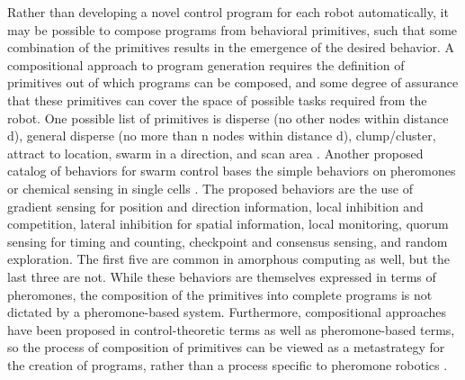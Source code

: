 Rather than developing a novel control program for each robot automatically, it may be possible to compose programs from behavioral primitives, such that some combination of the primitives results in the emergence of the desired behavior. 
A compositional approach to program generation requires the definition of primitives out of which programs can be composed, and some degree of assurance that these primitives can cover the space of possible tasks required from the robot. 
One possible list of primitives is disperse (no other nodes within distance d), general disperse (no more than n nodes within distance d), clump/cluster, attract to location, swarm in a direction, and scan area \citep{evans2000programming}.
Another proposed catalog of behaviors for swarm control bases the simple behaviors on pheromones or chemical sensing in single cells \citep{nagpal2004catalog}. 
The proposed behaviors are the use of gradient sensing for position and direction information, local inhibition and competition, lateral inhibition for spatial information, local monitoring, quorum sensing for timing and counting, checkpoint and consensus sensing, and random exploration. 
The first five are common in amorphous computing as well, but the last three are not. %
While these behaviors are themselves expressed in terms of pheromones, the composition of the primitives into complete programs is not dictated by a pheromone-based system.
Furthermore, compositional approaches have been proposed in control-theoretic terms as well as pheromone-based terms, so the process of composition of primitives can be viewed as a metastrategy for the creation of programs, rather than a process specific to pheromone robotics \citep{belta2007symbolic}.


